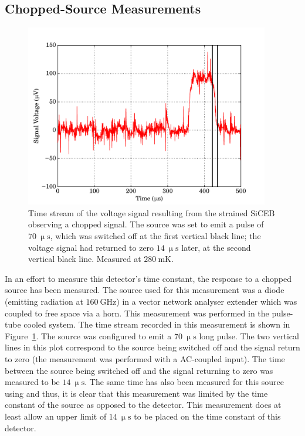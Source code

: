 \subsection{Chopped-Source Measurements}\label{ssec:opticalStrainedSi_chopped}
\begin{figure}[tb]
\begin{center}
\includegraphics[width = 0.95\textwidth]{figures/strained_pulseWidth}
\caption[Time stream of the voltage signal resulting from the strained SiCEB observing a chopped signal]{Time stream of the voltage signal resulting from the strained SiCEB observing a chopped signal. The source was set to emit a pulse of $70~\mathrm{\upmu s}$, which was switched off at the first vertical black line; the voltage signal had returned to zero $14~\mathrm{\upmu s}$ later, at the second vertical black line. Measured at $280~\mathrm{mK}$.}
\label{fig:strainedChopped_time}
\end{center}
\end{figure}
In an effort to measure this detector's time constant, the response to a chopped source has been measured. The source used for this measurement was a diode (emitting radiation at $160~\mathrm{GHz}$) in a vector network analyser extender which was coupled to free space via a horn. This measurement was performed in the pulse-tube cooled system. The time stream recorded in this measurement is shown in Figure~\ref{fig:strainedChopped_time}. The source was configured to emit a $70~\mathrm{\upmu s}$ long pulse. The two vertical lines in this plot correspond to the source being switched off and the signal return to zero (the measurement was performed with a AC-coupled input). The time between the source being switched off and the signal returning to zero was measured to be $14~\mathrm{\upmu s}$. The same time has also been measured for this source using  and thus, it is clear that this measurement was limited by the time constant of the source as opposed to the detector. This measurement does at least allow an upper limit of $14~\mathrm{\upmu s}$ to be placed on the time constant of this detector. 
